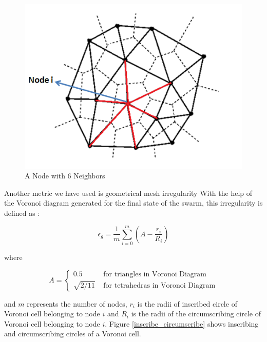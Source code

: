 \begin{figure}[H]
\caption{A Node with 6 Neighbors} \label{6komusulunode}
\centering
\includegraphics[scale = 0.70]{voronoi}
\end{figure}

Another metric we have used is geometrical mesh irregularity \cite{27}
With the help of the Voronoi diagram generated for the final state of the swarm, this irregularity is defined as \cite{27}:

\begin{equation}
\epsilon _g = \frac{1}{m} \sum_{i = 0}^{m} (A-\frac{r_i}{R_i})
\end{equation}

where
 
\begin{equation}
A = \left\{ \begin{array}{rl}
0.5                               &\mbox{ for triangles in Voronoi Diagram} \\
\sqrt{2/11}                   &\mbox{ for tetrahedras in Voronoi Diagram}
\end{array} \right.
\end{equation}
		
and $m$ represents the number of nodes, $r_i$ is the radii of inscribed circle of Voronoi cell belonging to node $i$ and $R_i$ is the radii of the circumscribing circle of Voronoi cell belonging to node $i$. Figure \ref{inscribe_circumscribe} shows inscribing and circumscribing circles of a Voronoi cell.
	
